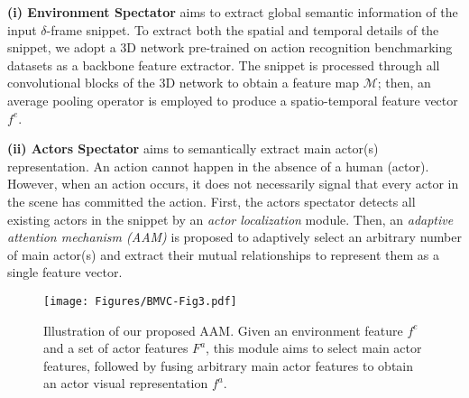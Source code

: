\documentclass{bmvc2k}
\begin{document}
\vspace{0.2cm}
\textbf{(i) Environment Spectator}
\label{subsubsec:env}
aims to extract global semantic information of the input $\delta$-frame snippet. To extract both the spatial and temporal details of the snippet, we adopt a 3D network pre-trained on action recognition benchmarking datasets as a backbone feature extractor. The snippet is processed through all convolutional blocks of the 3D network to obtain a feature map $\mathcal{M}$; then, an average pooling operator is employed to produce a spatio-temporal feature vector $f^{e}$.






\vspace{0.2cm}
\textbf{(ii) Actors Spectator}
\label{subsubsec:actors}
aims to semantically extract main actor(s) representation. An action cannot happen in the absence of a human (actor). However, when an action occurs, it does not necessarily signal that every actor in the scene has committed the action. First, the actors spectator detects all existing actors in the snippet by an \textit{actor localization} module. Then, an \textit{adaptive attention mechanism (AAM)} is proposed to adaptively select an arbitrary number of main actor(s) and extract their mutual relationships to represent them as a single feature vector.

\begin{figure}[t]
\centering
  \texttt{[image: Figures/BMVC-Fig3.pdf]}
  \vspace*{-0.1cm}
  \caption{Illustration of our proposed AAM. Given an environment feature $f^e$ and a set of actor features $F^a$, this module aims to select main actor features, followed by fusing arbitrary main actor features to obtain an actor visual representation $f^a$.}
  \vspace*{-0.4cm}
  \label{adaptive_attention}
\end{figure}
\end{document}
